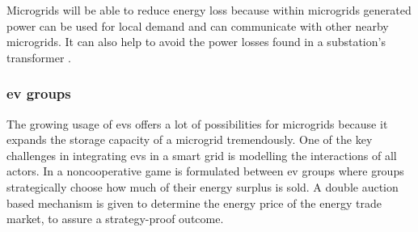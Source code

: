 Microgrids will be able to reduce energy loss because within microgrids generated power can be used for local demand and can communicate with other nearby microgrids. It can also help to avoid the power losses found in a substation's transformer \cite{keypaper}.

\subsubsection{\ac{ev} groups}
The growing usage of \ac{ev}s offers a lot of possibilities for microgrids because it expands the storage capacity of a microgrid tremendously. One of the key challenges in integrating \ac{ev}s in a smart grid is modelling the interactions of all actors. In \cite{SaadHanPoorEtAl2011} a noncooperative game is formulated between \ac{ev} groups where groups strategically choose how much of their energy surplus is sold. A double auction based mechanism is given to determine the energy price of the energy trade market, to assure a strategy-proof outcome. 





